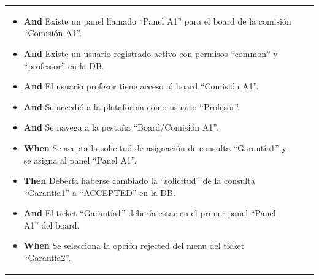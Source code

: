 \begin{longtable}{|p{1cm}|p{2.5cm}|p{12cm}|}
\begin{itemize}
        \item \textbf{And} Existe un panel llamado ``Panel A1'' para el board de la comisión ``Comisión A1''.
        \item \textbf{And} Existe un usuario registrado activo con permisos ``common'' y ``professor'' en la DB.
        \item \textbf{And} El usuario profesor tiene acceso al board ``Comisión A1''.
        \item \textbf{And} Se accedió a la plataforma como usuario ``Profesor''.
        \item \textbf{And} Se navega a la pestaña ``Board/Comisión A1''.
        \newline
        \item \textbf{When} Se acepta la solicitud de asignación de consulta ``Garant\'ia1'' y se asigna al panel ``Panel A1''.
        \newline
        
        \item \textbf{Then} Deber\'ia haberse cambiado la ``solicitud'' de la consulta ``Garant\'ia1'' a ``ACCEPTED'' en la DB.
        \item \textbf{And} El ticket ``Garant\'ia1'' debería estar en el primer panel ``Panel A1'' del board.
        \newline
        
        \item \textbf{When} Se selecciona la opción rejected del menu del ticket ``Garant\'ia2''.
        \newline


\end{itemize}
\end{longtable}
